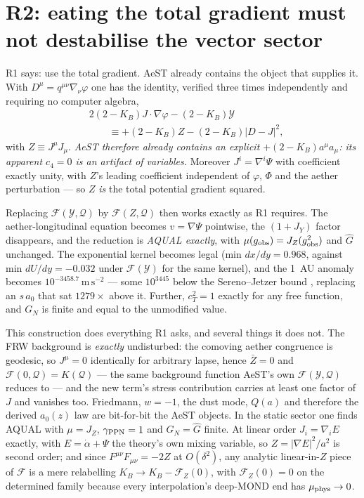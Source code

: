 \documentclass[aps,prd,twocolumn,10pt,nofootinbib,superscriptaddress]{revtex4-2}
\newcommand{\FF}{\mathcal{F}}
\newcommand{\YY}{\mathcal{Y}}
\newcommand{\QQ}{\mathcal{Q}}
\begin{document}
\section{R2: eating the total gradient must not destabilise the vector sector}

R1 says: use the total gradient. AeST already contains the object that supplies it. With
$D^\mu=q^{\mu\nu}\nabla_\nu\varphi$ one has the identity, verified three times independently and
requiring no computer algebra,
\begin{align}
&2(2-K_B)J\!\cdot\!\nabla\varphi-(2-K_B)\YY \nonumber\\
&\qquad\equiv +(2-K_B)Z-(2-K_B)|D-J|^2,
\label{eq:identity}
\end{align}
with $Z\equiv J^\mu J_\mu$. \emph{AeST therefore already contains an explicit
$+(2-K_B)a^\mu a_\mu$: its apparent $c_4=0$ is an artifact of variables.} Moreover
$J^i=\nabla^i\Psi$ with coefficient exactly unity, with $Z$'s leading coefficient independent of
$\varphi$, $\Phi$ and the aether perturbation --- so $Z$ \emph{is} the total potential gradient
squared.

Replacing $\FF(\YY,\QQ)$ by $\FF(Z,\QQ)$ then works exactly as R1 requires. The aether-longitudinal
equation becomes $v=\nabla\Psi$ pointwise, the $(1+J_Y)$ factor disappears, and the reduction is
\emph{AQUAL exactly}, with $\mu(g_{\rm obs})=J_Z(g_{\rm obs}^2)$ and $\hat G$ unchanged. The
exponential kernel becomes legal (min $dx/dy=0.968$, against min $dU/dy=-0.032$ under $\FF(\YY)$
for the same kernel), and the 1~AU anomaly becomes $10^{-3458.7}\,\mathrm{m\,s^{-2}}$ --- some
$10^{3445}$ below the Sereno--Jetzer bound \cite{SerenoJetzer}, replacing an $s\,a_0$ that sat
$1279\times$ above it. Further, $c_T^2=1$ exactly for any free function, and $G_N$ is finite and
equal to the unmodified value.

This construction does everything R1 asks, and several things it does not. The FRW background
is \emph{exactly} undisturbed: the comoving aether congruence is geodesic, so $J^\mu=0$
identically for arbitrary lapse, hence $\bar Z=0$ and $\FF(0,\QQ)=K(\QQ)$ --- the same background
function AeST's own $\FF(\YY,\QQ)$ reduces to --- and the new term's stress contribution carries at
least one factor of $J$ and vanishes too. Friedmann, $w=-1$, the dust mode, $Q(a)$ and therefore
the derived $a_0(z)$ law are bit-for-bit the AeST objects. In the static sector one finds AQUAL
with $\mu=J_Z$, $\gamma_{\rm PPN}=1$ and $G_N=\hat G$ finite. At linear order
$J_i=\nabla_i E$ exactly, with $E=\dot\alpha+\Psi$ the theory's own mixing variable, so
$Z=|\nabla E|^2/a^2$ is second order; and since $F^{\mu\nu}F_{\mu\nu}=-2Z$ at $O(\delta^2)$, any
analytic linear-in-$Z$ piece of $\FF$ is a mere relabelling $K_B\to K_B-\FF_Z(0)$, with
$\FF_Z(0)=0$ on the determined family because every interpolation's deep-MOND end has
$\mu_{\rm phys}\to0$.
\end{document}
